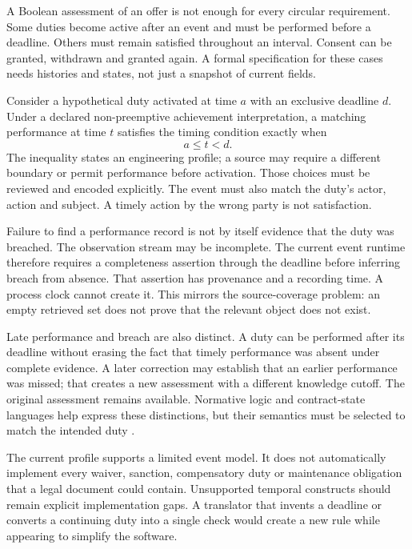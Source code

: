 \label{sec:proof-temporal}
A Boolean assessment of an offer is not enough for every circular requirement.
Some duties become active after an event and must be performed before a
deadline. Others must remain satisfied throughout an interval. Consent can be
granted, withdrawn and granted again. A formal specification for these cases
needs histories and states, not just a snapshot of current fields.

Consider a hypothetical duty activated at time $a$ with an exclusive deadline
$d$. Under a declared non-preemptive achievement interpretation, a matching
performance at time $t$ satisfies the timing condition exactly when
\begin{equation}
 a\leq t<d.
 \label{eq:performance-window}
\end{equation}
The inequality states an engineering profile; a source may require a different
boundary or permit performance before activation. Those choices must be
reviewed and encoded explicitly. The event must also match the duty's actor,
action and subject. A timely action by the wrong party is not satisfaction.


Failure to find a performance record is not by itself evidence that the duty
was breached. The observation stream may be incomplete. The current event
runtime therefore requires a completeness assertion through the deadline before
inferring breach from absence. That assertion has provenance and a recording
time. A process clock cannot create it. This mirrors the source-coverage
problem: an empty retrieved set does not prove that the relevant object does
not exist.

Late performance and breach are also distinct. A duty can be performed after
its deadline without erasing the fact that timely performance was absent under
complete evidence. A later correction may establish that an earlier performance
was missed; that creates a new assessment with a different knowledge cutoff.
The original assessment remains available. Normative logic and contract-state
languages help express these distinctions, but their semantics must be selected
to match the intended duty \citep{violations2006,normative2016,stipula2021}.

The current profile supports a limited event model. It does not automatically
implement every waiver, sanction, compensatory duty or maintenance obligation
that a legal document could contain. Unsupported temporal constructs should
remain explicit implementation gaps. A translator that invents a deadline or
converts a continuing duty into a single check would create a new rule while
appearing to simplify the software.

